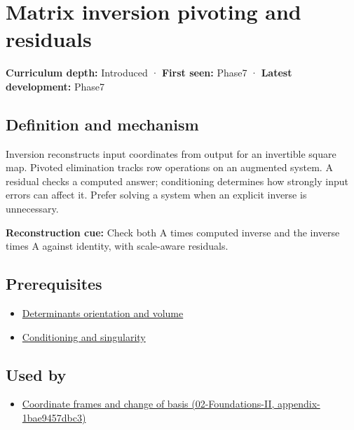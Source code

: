 \hypertarget{appendix-48d2e66378ab}{}
\section{Matrix inversion pivoting and residuals}\label{appendix-48d2e66378ab-matrix-inversion-pivoting-and-residuals}

\textbf{Curriculum depth:} Introduced · \textbf{First seen:} Phase7 · \textbf{Latest development:} Phase7

\subsection{Definition and mechanism}\label{appendix-48d2e66378ab-definition-and-mechanism}

Inversion reconstructs input coordinates from output for an invertible square map. Pivoted elimination tracks row operations on an augmented system. A residual checks a computed answer; conditioning determines how strongly input errors can affect it. Prefer solving a system when an explicit inverse is unnecessary.

\textbf{Reconstruction cue:} Check both A times computed inverse and the inverse times A against identity, with scale-aware residuals.

\subsection{Prerequisites}\label{appendix-48d2e66378ab-prerequisites}

\begin{itemize}
\tightlist
\item
  \hyperref[appendix-da478be01d02]{Determinants orientation and volume}
\item
  \hyperref[appendix-8f6a01f284a7]{Conditioning and singularity}
\end{itemize}

\subsection{Used by}\label{appendix-48d2e66378ab-used-by}

\begin{itemize}
\tightlist
\item
  \href{../02-Foundations-II/main.pdf\#nameddest=appendix-1bae9457dbc3}{Coordinate frames and change of basis (02-Foundations-II, appendix-1bae9457dbc3)}
\end{itemize}

